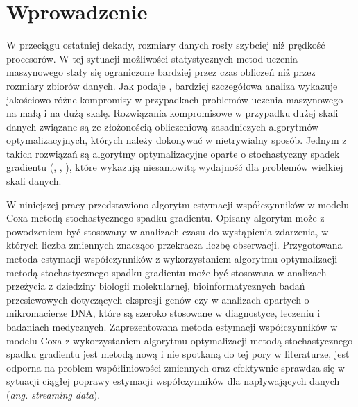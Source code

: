 \chapter*{Wprowadzenie}

W przeciągu ostatniej dekady, rozmiary danych rosły szybciej niż prędkość procesorów. W tej sytuacji możliwości statystycznych metod uczenia maszynowego stały się ograniczone bardziej przez czas obliczeń niż przez rozmiary zbiorów danych. Jak podaje \cite{bott1}, bardziej szczegółowa analiza wykazuje jakościowo różne kompromisy w przypadkach problemów uczenia maszynowego na małą i na dużą skalę. Rozwiązania kompromisowe w przypadku dużej skali danych związane są ze złożonością obliczeniową zasadniczych algorytmów optymalizacyjnych, których należy dokonywać w nietrywialny sposób. Jednym z takich rozwiązań są algorytmy optymalizacyjne oparte o stochastyczny spadek gradientu (\cite{bott1}, \cite{bott2}, \cite{widrow2}), które wykazują niesamowitą wydajność dla problemów wielkiej skali danych.

W niniejszej pracy przedstawiono algorytm estymacji współczynników w modelu Coxa metodą stochastycznego spadku gradientu. Opisany algorytm może z powodzeniem być stosowany w analizach czasu do wystąpienia zdarzenia, w których liczba zmiennych znacząco przekracza liczbę obserwacji. Przygotowana metoda estymacji współczynników z wykorzystaniem algorytmu optymalizacji metodą stochastycznego spadku gradientu może być stosowana w analizach przeżycia z dziedziny biologii molekularnej, bioinformatycznych badań przesiewowych dotyczących ekspresji genów czy w analizach opartych o mikromacierze DNA, które są szeroko stosowane w diagnostyce, leczeniu i badaniach medycznych. Zaprezentowana metoda estymacji współczynników w modelu Coxa z wykorzystaniem algorytmu optymalizacji metodą stochastycznego spadku gradientu jest metodą nową i nie spotkaną do tej pory w literaturze, jest odporna na problem współliniowości zmiennych oraz efektywnie sprawdza się w sytuacji ciągłej poprawy estymacji współczynników dla napływających danych (\textit{ang. streaming data}).

